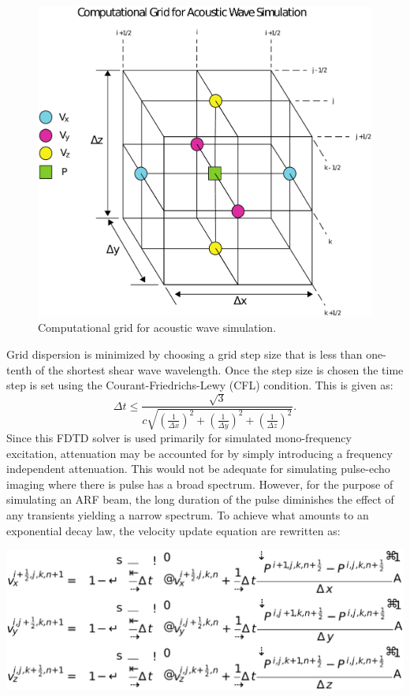 \begin{figure}[htb!]
    \centering
    \includegraphics[width=0.75\linewidth]{steve/figs/image6.png}
    \caption{Computational grid for acoustic wave simulation.} 
\label{fig:steve-staggered-grid}
\end{figure}

Grid dispersion is minimized by choosing a grid step size that is less than
one-tenth of the shortest shear wave wavelength. Once the step size is chosen
the time step is set using the Courant-Friedrichs-Lewy (CFL) condition. This is
given as:
\begin{equation*}
    \Delta t \leq \frac{\sqrt{3}}{c \sqrt{\left( \frac{1}{\Delta x}\right)^2 +
    \left( \frac{1}{\Delta y}\right)^2 + \left( \frac{1}{\Delta z}\right)^2}}.
\end{equation*}
Since this FDTD solver is used primarily for simulated mono-frequency
excitation, attenuation may be accounted for by simply introducing a frequency
independent attenuation. This would not be adequate for simulating pulse-echo
imaging where there is pulse has a broad spectrum. However, for the purpose of
simulating an ARF beam, the long duration of the pulse diminishes the effect of
any transients yielding a narrow spectrum. To achieve what amounts to an
exponential decay law, the velocity update equation are rewritten as:

\centerline{\includegraphics[width=0.65\linewidth]{steve/figs/image8.png}}

